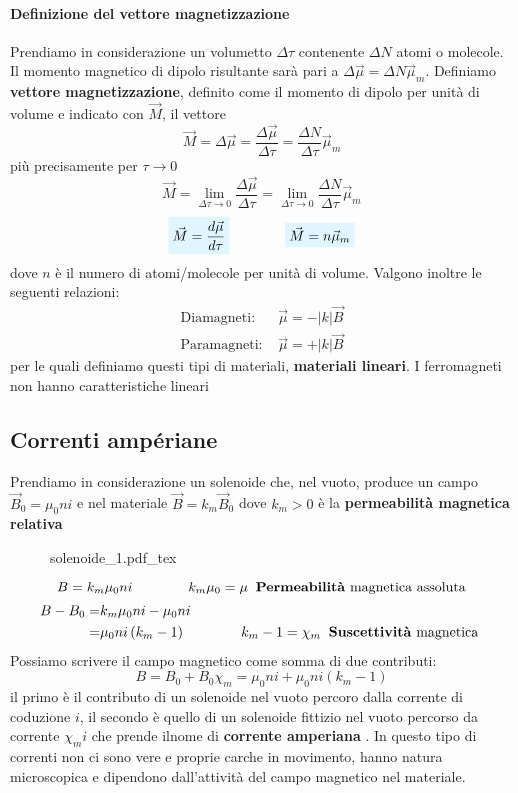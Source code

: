 \documentclass[x11names]{report}
\newcommand{\incfig}[1]{%
	{#1.pdf_tex}
}
\newcommand{\viola}[1]{%
	\colorbox{myblue}{$\displaystyle #1$}
}
\begin{document}
\paragraph{Definizione del vettore magnetizzazione}
Prendiamo in considerazione un volumetto \(\Delta\tau\) contenente \(\Delta N\) atomi o molecole. Il momento magnetico di dipolo risultante sarà pari a \(\Delta\vec{\mu} = \Delta N \vec{\mu}_m\). Definiamo \textbf{vettore magnetizzazione}, definito come il momento di dipolo per unità di volume e indicato con \(\vec{M}\), il vettore
\[
\vec{M} = \Delta\vec{\mu} = \frac{\Delta \vec{\mu}}{\Delta\tau} =\frac{\Delta N}{\Delta\tau} \vec{\mu}_m
\]
più precisamente per \(\tau \to 0\)
\[
\vec{M} = \lim_{\Delta\tau \to 0}\frac{\Delta \vec{\mu}}{\Delta\tau} = \lim_{\Delta\tau \to 0}\frac{\Delta N}{\Delta\tau} \vec{\mu}_m
\]
\begin{equation}
	\viola{\vec{M}= \frac{d \vec{\mu}}{d\tau}} \qquad \qquad	\viola{\vec{M} = n\vec{\mu}_m}
\end{equation}
dove \(n\) è il numero di atomi/molecole per unità di volume. Valgono inoltre le seguenti relazioni:
\[
\begin{array}{rc}
	\text{Diamagneti: } & \vec{\mu} = - |k| \vec{B} \\
	\text{Paramagneti: } & \vec{\mu} = + |k| \vec{B}
\end{array}
\]
per le quali definiamo questi tipi di materiali, \textbf{materiali lineari}. I ferromagneti non hanno caratteristiche lineari

\subsection{Correnti ampériane}
Prendiamo in considerazione un solenoide che, nel vuoto, produce un campo \(\vec{B}_0 = \mu_0 n i\) e nel materiale \(\vec{B} = k_m\vec{B}_0\) dove \(k_m > 0\) è la \textbf{permeabilità magnetica relativa}

\begin{figure}[H]
	\centering
	\incfig{solenoide_1}
\end{figure}
\[
B = k_m \mu_0 n i \qquad \qquad k_m\mu_0 = \mu \: \text{ \textbf{Permeabilità} magnetica assoluta} 
\]
\begin{align*}
	B - B_0 =&  k_m \mu_0 n i - \mu_0 n i \\
			=& \mu_0 n i\left(k_m -1\right) \qquad \qquad k_m - 1= \chi_m \: \text{ \textbf{Suscettività} magnetica } \\
\end{align*}
Possiamo scrivere il campo magnetico come somma di due contributi:
\[
B = B_0  + B_0\chi_m = \mu_0 n i + \mu_0 n i\left(k_m -1\right)
\]
il primo è il contributo di un solenoide nel vuoto percoro dalla corrente di coduzione \(i\), il secondo è quello di un solenoide fittizio nel vuoto percorso da corrente \(\chi_m i\) che prende ilnome di \textbf{corrente amperiana}	. In questo tipo di correnti non ci sono vere e proprie carche in movimento, hanno natura microscopica e dipendono dall'attività del campo magnetico nel materiale.
\end{document}
